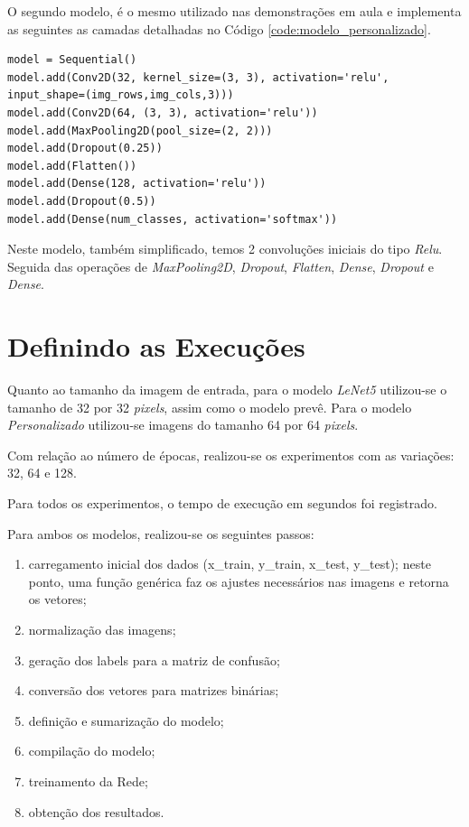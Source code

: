 \documentclass[12pt]{article}
\begin{document}
O segundo modelo, é o mesmo utilizado nas demonstrações em aula e implementa as seguintes as camadas detalhadas no Código \ref{code:modelo_personalizado}.

\begin{lstlisting}[caption={Modelo Personalizado},captionpos=b,frame=single,label={code:modelo_personalizado}]
model = Sequential()
model.add(Conv2D(32, kernel_size=(3, 3), activation='relu', input_shape=(img_rows,img_cols,3)))
model.add(Conv2D(64, (3, 3), activation='relu'))
model.add(MaxPooling2D(pool_size=(2, 2)))
model.add(Dropout(0.25))
model.add(Flatten())
model.add(Dense(128, activation='relu'))
model.add(Dropout(0.5))
model.add(Dense(num_classes, activation='softmax'))
\end{lstlisting}

Neste modelo, também simplificado, temos 2 convoluções iniciais do tipo \textit{Relu}.
Seguida das operações de \textit{MaxPooling2D}, \textit{Dropout}, \textit{Flatten}, \textit{Dense}, \textit{Dropout} e \textit{Dense}.

\section{Definindo as Execuções}

Quanto ao tamanho da imagem de entrada, para o modelo \textit{LeNet5} utilizou-se o tamanho de 32 por 32 \textit{pixels}, assim como o modelo prevê. Para o modelo \textit{Personalizado} utilizou-se imagens do tamanho 64 por 64 \textit{pixels}.

Com relação ao número de épocas, realizou-se os experimentos com as variações: 32, 64 e 128.

Para todos os experimentos, o tempo de execução em segundos foi registrado.

Para ambos os modelos, realizou-se os seguintes passos:

\begin{enumerate}
  \item carregamento inicial dos dados (x\_train, y\_train, x\_test, y\_test); neste ponto, uma função genérica faz os ajustes necessários nas imagens e retorna os vetores;
  \item normalização das imagens;
  \item geração dos labels para a matriz de confusão;
  \item conversão dos vetores para matrizes binárias;
  \item definição e sumarização do modelo;
  \item compilação do modelo;
  \item treinamento da Rede;
  \item obtenção dos resultados.
\end{enumerate}
\end{document}
